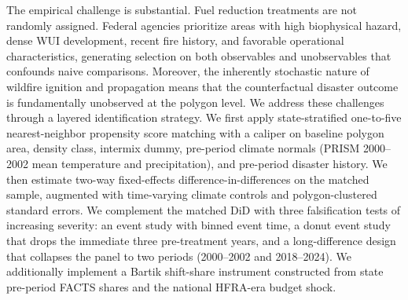 \documentclass[12pt, letterpaper]{article}
\begin{document}
The empirical challenge is substantial. Fuel reduction treatments are not randomly assigned. Federal agencies prioritize areas with high biophysical hazard, dense WUI development, recent fire history, and favorable operational characteristics, generating selection on both observables and unobservables that confounds naive comparisons. Moreover, the inherently stochastic nature of wildfire ignition and propagation means that the counterfactual disaster outcome is fundamentally unobserved at the polygon level. We address these challenges through a layered identification strategy. We first apply state-stratified one-to-five nearest-neighbor propensity score matching with a caliper on baseline polygon area, density class, intermix dummy, pre-period climate normals (PRISM 2000--2002 mean temperature and precipitation), and pre-period disaster history. We then estimate two-way fixed-effects difference-in-differences on the matched sample, augmented with time-varying climate controls and polygon-clustered standard errors. We complement the matched DiD with three falsification tests of increasing severity: an event study with binned event time, a donut event study that drops the immediate three pre-treatment years, and a long-difference design that collapses the panel to two periods (2000--2002 and 2018--2024). We additionally implement a Bartik shift-share instrument constructed from state pre-period FACTS shares and the national HFRA-era budget shock.
\end{document}
